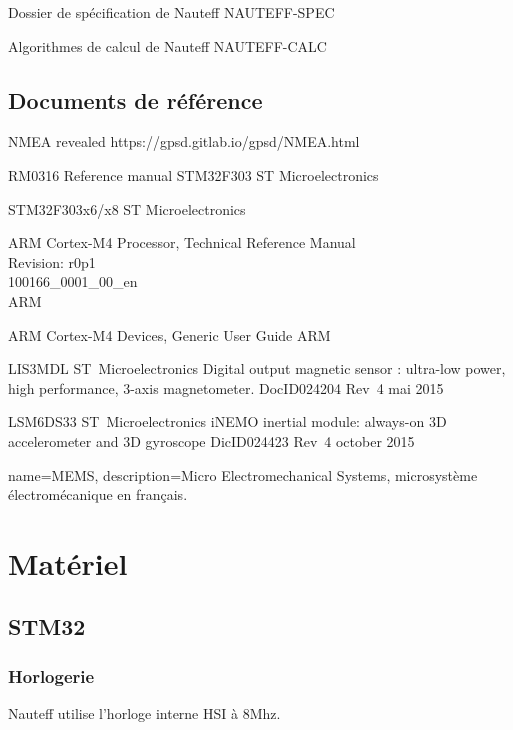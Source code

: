\documentclass[a4paper,11pt]{report}
\begin{document}


Dossier de spécification de Nauteff
NAUTEFF-SPEC
\cite{LSM6DS33}
\cite{Nauteff-Spec}
\cite{Nauteff-Algo}
\cite{NMEARevealed}

Algorithmes de calcul de Nauteff
NAUTEFF-CALC

\section{Documents de référence}

NMEA revealed
https://gpsd.gitlab.io/gpsd/NMEA.html

RM0316 Reference manual STM32F303
ST Microelectronics

STM32F303x6/x8
ST Microelectronics

ARM Cortex-M4 Processor, Technical Reference Manual\\
Revision: r0p1\\
100166\_0001\_00\_en\\
ARM

ARM Cortex-M4 Devices, Generic User Guide
ARM

LIS3MDL
ST~Microelectronics
Digital output magnetic sensor : ultra-low power, high performance, 3-axis magnetometer.
DocID024204 Rev~4
mai 2015

LSM6DS33
ST~Microelectronics
iNEMO inertial module: always-on 3D accelerometer and 3D gyroscope
DicID024423 Rev~4
october 2015

\printglossary[numberedsection, title=Terminologie]

{
  name={MEMS},
  description={Micro Electromechanical Systems, microsystème électromécanique en français.}
}


\chapter{Matériel}
\section{STM32}
\subsection{Horlogerie}
Nauteff utilise l'horloge interne HSI à 8Mhz.
\end{document}
